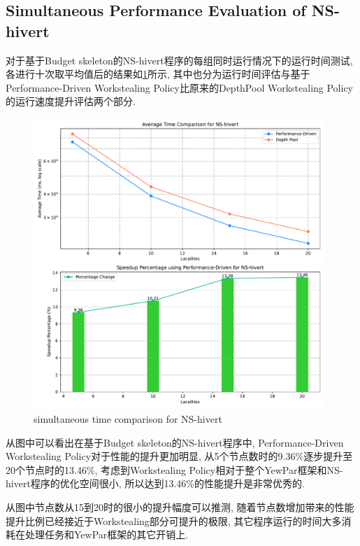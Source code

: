 \documentclass{mproj}
\begin{document}
\subsection{Simultaneous Performance Evaluation of NS-hivert}

对于基于Budget skeleton的NS-hivert程序的每组同时运行情况下的运行时间测试,各进行十次取平均值后的结果如\cref{fig:time_comparison_ns_simu}所示,
其中也分为运行时间评估与基于Performance-Driven Workstealing Policy比原来的DepthPool Workstealing Policy的运行速度提升评估两个部分.

\begin{figure}[h]
    \centering %
    \includegraphics[width=0.98\textwidth]{images/time_comparison_ns_simultaneously.pdf} %
    \caption{simultaneous time comparison for NS-hivert} %
    \label{fig:time_comparison_ns_simu} %
\end{figure}
\FloatBarrier

从图中可以看出在基于Budget skeleton的NS-hivert程序中,
Performance-Driven Workstealing Policy对于性能的提升更加明显,
从5个节点数时的9.36\%逐步提升至20个节点时的13.46\%,
考虑到Workstealing Policy相对于整个YewPar框架和NS-hivert程序的优化空间很小,
所以达到13.46\%的性能提升是非常优秀的.

从图中节点数从15到20时的很小的提升幅度可以推测,
随着节点数增加带来的性能提升比例已经接近于Workstealing部分可提升的极限,
其它程序运行的时间大多消耗在处理任务和YewPar框架的其它开销上.
\end{document}
